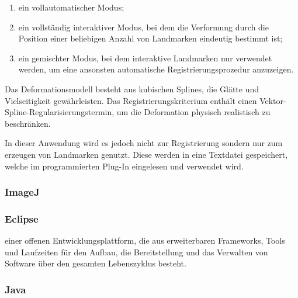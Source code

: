 \begin{enumerate}
\item ein vollautomatischer Modus; 
\item ein vollständig interaktiver Modus, bei dem die Verformung durch die Position einer beliebigen Anzahl von Landmarken eindeutig bestimmt ist; 
\item ein gemischter Modus, bei dem interaktive Landmarken nur verwendet werden, um eine ansonsten automatische Registrierungsprozedur anzuzeigen.
\end{enumerate}

Das Deformationsmodell besteht aus kubischen Splines, die Glätte und Vielseitigkeit gewährleisten. Das Registrierungskriterium enthält einen Vektor-Spline-Regularisierungstermin, um die Deformation physisch realistisch zu beschränken.\cite{unwrapj}

In dieser Anwendung wird es jedoch nicht zur Registrierung sondern nur zum erzeugen von Landmarken genutzt. Diese werden in eine Textdatei gespeichert, welche im programmierten Plug-In eingelesen und verwendet wird.


\subsubsection{ImageJ}
\newpage

\subsubsection{Eclipse}
einer offenen Entwicklungsplattform, die aus erweiterbaren Frameworks, Tools und Laufzeiten für den Aufbau, die Bereitstellung und das Verwalten von Software über den gesamten Lebenszyklus besteht.
\cite{eclipse}

\subsubsection{Java}